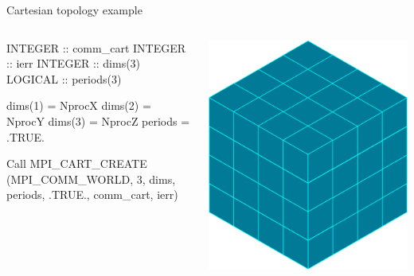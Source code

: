 \documentclass[aspectratio=43]{beamer}
\begin{document}
\begin{frame}[fragile]{Cartesian topology example}
\footnotesize
\vspace{-1.3cm}
\begin{columns}
\begin{column}{0.55\paperwidth}
\begin{Fortranlisting}[]{}
INTEGER :: comm_cart
INTEGER :: ierr
INTEGER :: dims(3)
LOGICAL :: periods(3)

dims(1) = NprocX
dims(2) = NprocY
dims(3) = NprocZ
periods = .TRUE.

Call MPI_CART_CREATE (MPI_COMM_WORLD, 3, dims, periods, .TRUE., comm_cart, ierr)
\end{Fortranlisting}
\end{column}
\begin{column}{0.4\paperwidth}
\includegraphics[scale=0.36]{05.MPI_Topo/3dcube.pdf}
\end{column}
\end{columns}
\end{frame}
\end{document}
